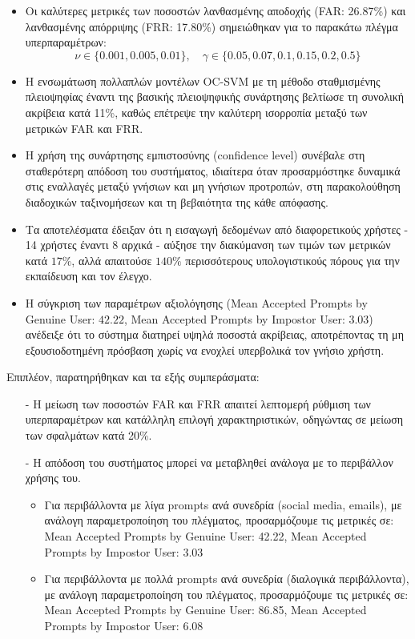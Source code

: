 \begin{itemize}
    \item{
        Οι καλύτερες μετρικές των ποσοστών λανθασμένης αποδοχής (FAR: 26.87\%) και λανθασμένης απόρριψης (FRR: 17.80\%) σημειώθηκαν για το παρακάτω πλέγμα υπερπαραμέτρων: 
        \[
        \nu \in \{0.001, 0.005, 0.01\}, \quad \gamma \in \{0.05, 0.07, 0.1, 0.15, 0.2, 0.5\}
        \]
    }
    \item{
        Η ενσωμάτωση πολλαπλών μοντέλων OC-SVM με τη μέθοδο σταθμισμένης πλειοψηφίας έναντι της βασικής πλειοψηφικής συνάρτησης βελτίωσε τη συνολική ακρίβεια κατά 11\%, καθώς επέτρεψε την καλύτερη ισορροπία μεταξύ των μετρικών FAR και FRR.
    }
    \item{
        Η χρήση της συνάρτησης εμπιστοσύνης (confidence level) συνέβαλε στη σταθερότερη απόδοση του συστήματος, ιδιαίτερα όταν προσαρμόστηκε δυναμικά στις εναλλαγές μεταξύ γνήσιων και μη γνήσιων προτροπών, στη παρακολούθηση διαδοχικών ταξινομήσεων και τη βεβαιότητα της κάθε απόφασης.
    }
    \item{
        Τα αποτελέσματα έδειξαν ότι η εισαγωγή δεδομένων από διαφορετικούς χρήστες - 14 χρήστες έναντι 8 αρχικά - αύξησε την διακύμανση των τιμών των μετρικών κατά $17\%$, αλλά απαιτούσε $140\%$ περισσότερους υπολογιστικούς πόρους για την εκπαίδευση και τον έλεγχο.
    }
    \item{
    \begin{sloppypar}
        Η σύγκριση των παραμέτρων αξιολόγησης (Mean Accepted Prompts by Genuine User: $42.22$, Mean Accepted Prompts by Impostor User: $3.03$) ανέδειξε ότι το σύστημα διατηρεί υψηλά ποσοστά ακρίβειας, αποτρέποντας τη μη εξουσιοδοτημένη πρόσβαση χωρίς να ενοχλεί υπερβολικά τον γνήσιο χρήστη.
    \end{sloppypar}
    }
\end{itemize}

Επιπλέον, παρατηρήθηκαν και τα εξής συμπεράσματα:

\begin{itemize}
    \item[-]
    Η μείωση των ποσοστών FAR και FRR απαιτεί λεπτομερή ρύθμιση των υπερπαραμέτρων και κατάλληλη επιλογή χαρακτηριστικών, οδηγώντας σε μείωση των σφαλμάτων κατά 20\%.
    \item[-]
    Η απόδοση του συστήματος μπορεί να μεταβληθεί ανάλογα με το περιβάλλον χρήσης του. 
    \begin{itemize}
        \item{
        Για περιβάλλοντα με λίγα prompts ανά συνεδρία (social media, emails), με ανάλογη παραμετροποίηση του πλέγματος, προσαρμόζουμε τις μετρικές σε: Mean Accepted Prompts by Genuine User: 42.22, Mean Accepted Prompts by Impostor User: 3.03
        }
        \item{
        Για περιβάλλοντα με πολλά prompts ανά συνεδρία (διαλογικά περιβάλλοντα), με ανάλογη παραμετροποίηση του πλέγματος, προσαρμόζουμε τις μετρικές σε: Mean Accepted Prompts by Genuine User: 86.85, Mean Accepted Prompts by Impostor User: 6.08
        }
    \end{itemize}
\end{itemize}


